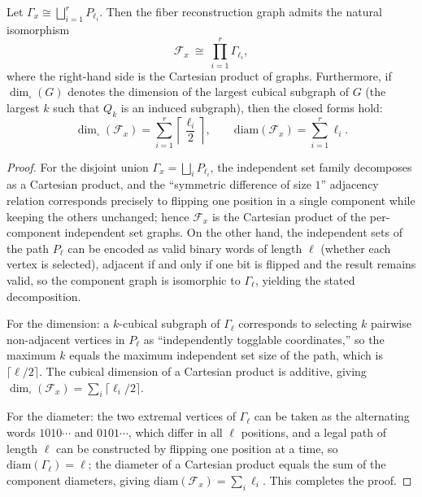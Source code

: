 \begin{theorem}\label{thm:pom-fiber-reconstruction-cartesian-product}
Let \(\Gamma_x\cong\bigsqcup_{i=1}^r P_{\ell_i}\).
Then the fiber reconstruction graph admits the natural isomorphism
\[
\mathcal F_x\ \cong\ \prod_{i=1}^r \Gamma_{\ell_i},
\]
where the right-hand side is the Cartesian product of graphs.
Furthermore, if \(\dim_{\square}(G)\) denotes the dimension of the largest cubical subgraph of \(G\) (the largest \(k\) such that \(Q_k\) is an induced subgraph), then the closed forms hold:
\[
\dim_{\square}(\mathcal F_x)=\sum_{i=1}^r \left\lceil\frac{\ell_i}{2}\right\rceil,
\qquad
\mathrm{diam}(\mathcal F_x)=\sum_{i=1}^r \ell_i.
\]
\end{theorem}
\begin{proof}
For the disjoint union \(\Gamma_x=\bigsqcup_i P_{\ell_i}\), the independent set family decomposes as a Cartesian product,
and the ``symmetric difference of size \(1\)'' adjacency relation corresponds precisely to flipping one position in a single component while keeping the others unchanged;
hence \(\mathcal F_x\) is the Cartesian product of the per-component independent set graphs.
On the other hand, the independent sets of the path \(P_{\ell}\) can be encoded as valid binary words of length \(\ell\) (whether each vertex is selected), adjacent if and only if one bit is flipped and the result remains valid,
so the component graph is isomorphic to \(\Gamma_{\ell}\), yielding the stated decomposition.
\par
For the dimension: a \(k\)-cubical subgraph of \(\Gamma_{\ell}\) corresponds to selecting \(k\) pairwise non-adjacent vertices in \(P_{\ell}\) as ``independently togglable coordinates,''
so the maximum \(k\) equals the maximum independent set size of the path, which is \(\lceil \ell/2\rceil\).
The cubical dimension of a Cartesian product is additive, giving \(\dim_{\square}(\mathcal F_x)=\sum_i\lceil\ell_i/2\rceil\).
\par
For the diameter: the two extremal vertices of \(\Gamma_{\ell}\) can be taken as the alternating words \(1010\cdots\) and \(0101\cdots\), which differ in all \(\ell\) positions,
and a legal path of length \(\ell\) can be constructed by flipping one position at a time, so \(\mathrm{diam}(\Gamma_{\ell})=\ell\);
the diameter of a Cartesian product equals the sum of the component diameters, giving \(\mathrm{diam}(\mathcal F_x)=\sum_i\ell_i\).
This completes the proof.
\end{proof}

